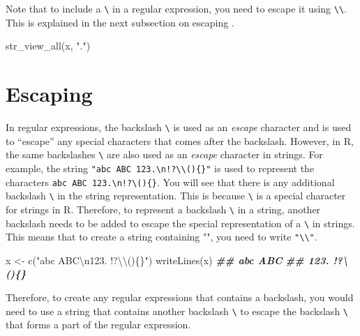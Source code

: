 \documentclass[
]{book}
\newenvironment{Shaded}{\begin{snugshade}}{\end{snugshade}}
\newcommand{\DocumentationTok}[1]{\textcolor[rgb]{0.56,0.35,0.01}{\textbf{\textit{#1}}}}
\newcommand{\FunctionTok}[1]{\textcolor[rgb]{0.00,0.00,0.00}{#1}}
\newcommand{\NormalTok}[1]{#1}
\newcommand{\OtherTok}[1]{\textcolor[rgb]{0.56,0.35,0.01}{#1}}
\newcommand{\SpecialCharTok}[1]{\textcolor[rgb]{0.00,0.00,0.00}{#1}}
\newcommand{\StringTok}[1]{\textcolor[rgb]{0.31,0.60,0.02}{#1}}
\begin{document}
Note that to include a \texttt{\textbackslash{}} in a regular expression, you need to escape it using \texttt{\textbackslash{}\textbackslash{}}. This is explained in the next subsection on escaping .

\begin{Shaded}
\begin{Highlighting}[]
\FunctionTok{str\_view\_all}\NormalTok{(x, }\StringTok{"."}\NormalTok{)}
\end{Highlighting}
\end{Shaded}

\hypertarget{regex-escape}{%
\section{Escaping}\label{regex-escape}}

In regular expressions, the backslash \texttt{\textbackslash{}} is used as an \emph{escape} character and is used to ``escape'' any special characters that comes after the backslash. However, in R, the same backslashes \texttt{\textbackslash{}} are also used as an \emph{escape} character in strings. For example, the string \texttt{"abc\ ABC\ 123.\textbackslash{}n!?\textbackslash{}\textbackslash{}()\{\}"} is used to represent the characters \texttt{abc\ ABC\ 123.\textbackslash{}n!?\textbackslash{}()\{\}}. You will see that there is any additional backslash \texttt{\textbackslash{}} in the string representation. This is because \texttt{\textbackslash{}} is a special character for strings in R. Therefore, to represent a backslash \texttt{\textbackslash{}} in a string, another backslash needs to be added to escape the special representation of a \texttt{\textbackslash{}} in strings. This means that to create a string containing "", you need to write \texttt{"\textbackslash{}\textbackslash{}"}.

\begin{Shaded}
\begin{Highlighting}[]
\NormalTok{x }\OtherTok{\textless{}{-}} \FunctionTok{c}\NormalTok{(}\StringTok{"abc ABC}\SpecialCharTok{\textbackslash{}n}\StringTok{123. !?}\SpecialCharTok{\textbackslash{}\textbackslash{}}\StringTok{()\{\}"}\NormalTok{)}
\FunctionTok{writeLines}\NormalTok{(x)}
\DocumentationTok{\#\# abc ABC}
\DocumentationTok{\#\# 123. !?\textbackslash{}()\{\}}
\end{Highlighting}
\end{Shaded}

Therefore, to create any regular expressions that contains a backslash, you would need to use a string that contains another backslash \texttt{\textbackslash{}} to escape the backslash \texttt{\textbackslash{}} that forms a part of the regular expression.
\end{document}
